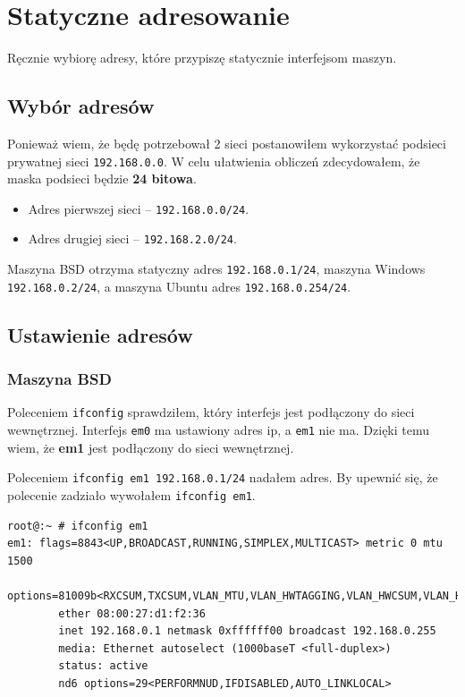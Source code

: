 \documentclass{mwart} %
\begin{document}
\section{Statyczne adresowanie}
Ręcznie wybiorę adresy, które przypiszę statycznie interfejsom maszyn.

\subsection{Wybór adresów}
Ponieważ wiem, że będę potrzebował 2 sieci postanowiłem wykorzystać podsieci prywatnej sieci \texttt{192.168.0.0}. W celu ułatwienia obliczeń zdecydowałem, że maska podsieci będzie \textbf{24 bitowa}.

\begin{itemize}
  \item Adres pierwszej sieci -- \texttt{192.168.0.0/24}.
  \item Adres drugiej sieci -- \texttt{192.168.2.0/24}.
\end{itemize}

Maszyna BSD otrzyma statyczny adres \texttt{192.168.0.1/24}, maszyna Windows \texttt{192.168.0.2/24}, a maszyna Ubuntu adres \texttt{192.168.0.254/24}.

\subsection{Ustawienie adresów}
\subsubsection{Maszyna BSD}
Poleceniem \texttt{ifconfig} sprawdziłem, który interfejs jest podłączony do sieci wewnętrznej. Interfejs \texttt{em0} ma ustawiony adres ip, a \texttt{em1} nie ma. Dzięki temu wiem, że \textbf{em1} jest podłączony do sieci wewnętrznej.

Poleceniem \texttt{ifconfig em1 192.168.0.1/24} nadałem adres. By upewnić się, że polecenie zadziało wywołałem \texttt{ifconfig em1}.

\begin{verbatim}
root@:~ # ifconfig em1
em1: flags=8843<UP,BROADCAST,RUNNING,SIMPLEX,MULTICAST> metric 0 mtu 1500
        options=81009b<RXCSUM,TXCSUM,VLAN_MTU,VLAN_HWTAGGING,VLAN_HWCSUM,VLAN_HWFILTER>
        ether 08:00:27:d1:f2:36
        inet 192.168.0.1 netmask 0xffffff00 broadcast 192.168.0.255
        media: Ethernet autoselect (1000baseT <full-duplex>)
        status: active
        nd6 options=29<PERFORMNUD,IFDISABLED,AUTO_LINKLOCAL>
\end{verbatim}
\end{document}
